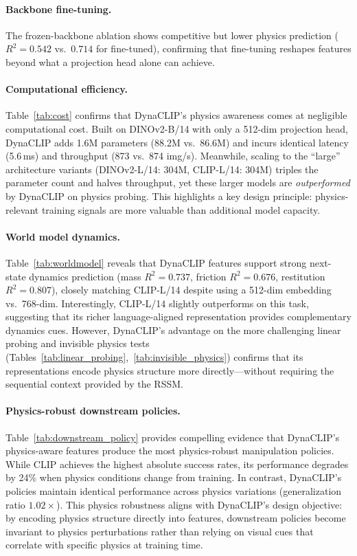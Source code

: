 \documentclass{article}
\newcommand{\methodname}{DynaCLIP}
\begin{document}
\paragraph{Backbone fine-tuning.}
The frozen-backbone ablation shows competitive but lower physics prediction ($R^2 = 0.542$ vs.\ $0.714$ for fine-tuned), confirming that fine-tuning reshapes features beyond what a projection head alone can achieve.

\paragraph{Computational efficiency.}
Table~\ref{tab:cost} confirms that \methodname{}'s physics awareness comes at negligible computational cost. Built on DINOv2-B/14 with only a 512-dim projection head, \methodname{} adds 1.6M parameters (88.2M vs.\ 86.6M) and incurs identical latency (5.6\,ms) and throughput (873 vs.\ 874 img/s). Meanwhile, scaling to the ``large'' architecture variants (DINOv2-L/14: 304M, CLIP-L/14: 304M) triples the parameter count and halves throughput, yet these larger models are \emph{outperformed} by \methodname{} on physics probing. This highlights a key design principle: physics-relevant training signals are more valuable than additional model capacity.

\paragraph{World model dynamics.}
Table~\ref{tab:worldmodel} reveals that \methodname{} features support strong next-state dynamics prediction (mass $R^2{=}0.737$, friction $R^2{=}0.676$, restitution $R^2{=}0.807$), closely matching CLIP-L/14 despite using a 512-dim embedding vs.\ 768-dim. Interestingly, CLIP-L/14 slightly outperforms on this task, suggesting that its richer language-aligned representation provides complementary dynamics cues. However, DynaCLIP's advantage on the more challenging linear probing and invisible physics tests (Tables~\ref{tab:linear_probing},~\ref{tab:invisible_physics}) confirms that its representations encode physics structure more directly---without requiring the sequential context provided by the RSSM.

\paragraph{Physics-robust downstream policies.}
Table~\ref{tab:downstream_policy} provides compelling evidence that \methodname{}'s physics-aware features produce the most physics-robust manipulation policies. While CLIP achieves the highest absolute success rates, its performance degrades by 24\% when physics conditions change from training. In contrast, \methodname{}'s policies maintain identical performance across physics variations (generalization ratio $1.02\times$). This physics robustness aligns with \methodname{}'s design objective: by encoding physics structure directly into features, downstream policies become invariant to physics perturbations rather than relying on visual cues that correlate with specific physics at training time.
\end{document}
